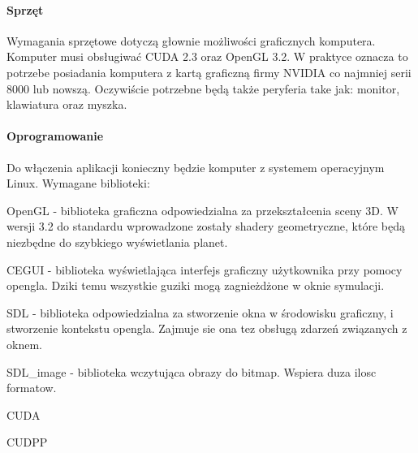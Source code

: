 \paragraph{Sprzęt}
Wymagania sprzętowe dotyczą głownie możliwości graficznych komputera. Komputer musi obsługiwać CUDA 2.3 oraz OpenGL 3.2. W praktyce oznacza to potrzebe posiadania komputera z kartą graficzną firmy NVIDIA co najmniej  serii 8000 lub nowszą. Oczywiście potrzebne będą także peryferia take jak: monitor, klawiatura oraz myszka.

\paragraph{Oprogramowanie}
Do włączenia aplikacji konieczny będzie komputer z systemem operacyjnym Linux. Wymagane biblioteki: 
\begin{description}
\item{OpenGL} - biblioteka graficzna odpowiedzialna za przekształcenia sceny 3D. W wersji 3.2 do standardu wprowadzone zostały shadery geometryczne, które będą niezbędne do szybkiego wyświetlania planet.
\item{CEGUI} - biblioteka wyświetlająca interfejs graficzny użytkownika przy pomocy opengla. Dziki temu wszystkie guziki mogą zagnieżdżone w oknie symulacji.
\item{SDL} - biblioteka odpowiedzialna za stworzenie okna w środowisku graficzny, i stworzenie kontekstu opengla. Zajmuje sie ona tez obsługą zdarzeń związanych z oknem.
\item{SDL\_image} - biblioteka wczytująca obrazy do bitmap. Wspiera duza ilosc formatow.
\item{CUDA}
\item{CUDPP}
\end{description}


